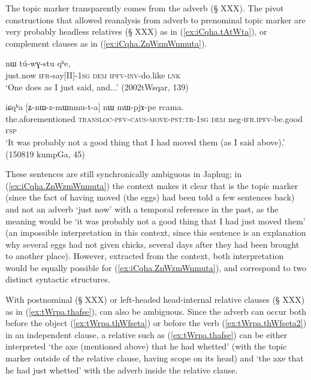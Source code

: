  
The topic marker  transparently comes from the adverb  (§ XXX). The pivot constructions that allowed reanalysis from adverb to prenominal topic marker are very probably headless relatives (§ XXX) as in  (\ref{ex:iCqha.tAtWta}), or complement clauses as in (\ref{ex:iCqha.ZnWzmWnmuta}). 

\begin{exe}
\ex \label{ex:iCqha.tAtWta}
  nɯ tú-wɣ-stu qʰe, \\
 just.now \textsc{ifr}-say[II]-\textsc{1sg} \textsc{dem} \textsc{ipfv}-\textsc{inv}-do.like \textsc{lnk} \\
\glt `One does as I just said, and...' (2002tWsqar, 139)
\end{exe}

\begin{exe}
\ex \label{ex:iCqha.ZnWzmWnmuta}
 \gll iɕqʰa [ʑ-nɯ-z-mɯnmu-t-a] nɯ mɯ-pjɤ-pe rcama.  \\
the.aforementioned  \textsc{transloc}-\textsc{pfv}-\textsc{caus}-\textsc{move}-\textsc{pst}:\textsc{tr}-\textsc{1sg} \textsc{dem} neg-\textsc{ifr}.\textsc{ipfv}-be.good \textsc{fsp} \\
\glt `It was probably not a good thing that I had moved them (as I said above).' (150819 kumpGa, 45)
 \end{exe}
 
 These sentences are still synchronically ambiguous in Japhug; in  (\ref{ex:iCqha.ZnWzmWnmuta}) the context makes it clear that  is the topic marker (since the fact of having moved (the eggs) had been told a few sentences back) and not an adverb `just now' with a temporal reference in the past, as the meaning would be `it was probably not a good thing that I had just moved them' (an impossible interpretation in this context, since this sentence is an explanation why several eggs had not given chicks, several days after they had been brought to another place). However, extracted from the context, both interpretation would be equally possible for (\ref{ex:iCqha.ZnWzmWnmuta}), and correspond to two distinct syntactic structures.

With postnominal (§ XXX) or left-headed head-internal relative clauses (§ XXX) as in (\ref{ex:tWrpa.thafse}),  can also be ambiguous. Since the adverb  can occur both before the object (\ref{ex:tWrpa.thWfseta}) or before the verb (\ref{ex:tWrpa.thWfseta2}) in an independent clause, a relative such as (\ref{ex:tWrpa.thafse}) can be either interpreted `the axe (mentioned above) that he had whetted' (with the topic marker  outside of the relative clause, having scope on its head) and `the axe that he had just whetted' with the adverb  inside the relative clause.

